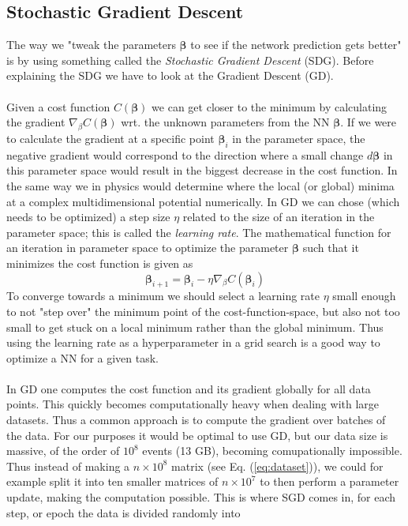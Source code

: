 \documentclass[14pt, a4paper]{book}
\begin{document}
\subsection{Stochastic Gradient Descent}\label{sec:SGD}
The way we "tweak the parameters $\bm \beta $ to see if the network prediction gets better" is by using something called the \textit{Stochastic Gradient Descent} (SDG). Before explaining the SDG we have to look at the Gradient Descent (GD). \\
\\Given a cost function $C(\bm{\beta})$ we can get closer to the minimum by calculating the gradient $\nabla_{\beta}C(\bm{\beta})$ wrt. the unknown parameters from the NN $\bm\beta$. If we were to calculate the gradient at a specific 
point $\bm{\beta}_i$ in the parameter space, the negative gradient would correspond to the direction where a small change $d\bm\beta$ in this parameter space would result in the biggest decrease in the cost function. 
In the same way we in physics would determine where the local (or global) minima at a complex multidimensional potential numerically. In GD we can chose (which needs to be optimized) a step size $\eta$ related to the size of an iteration in the parameter space; 
this is called the \textit{learning rate}. The mathematical function for an iteration in parameter space to optimize the parameter $\bm{\beta}$ such that it minimizes the cost function is given as
\begin{equation}\label{eq:GD}
    \bm{\beta}_{i+1}=\bm{\beta}_{i} -\eta\nabla_{\beta}C(\bm{\beta}_i)
\end{equation}
To converge towards a minimum we should select a learning rate $\eta$ small enough to not "step over" the minimum point of the cost-function-space, but also not too small to get stuck on a local minimum rather than the global minimum. 
Thus using the learning rate as a hyperparameter in a grid search is a good way to optimize a NN for a given task.\\
\\In GD one computes the cost function and its gradient globally for all data points. This quickly becomes computationally heavy when dealing with large datasets. Thus a common approach is to compute the gradient over batches of the data. 
For our purposes it would be optimal to use GD, but our data size is massive, of the order of $10^{8}$ events (13 GB), becoming comupationally impossible. Thus instead of making a $n\times10^8$ matrix (see Eq. (\ref{eq:dataset})), 
we could for example split it into ten smaller matrices of $n\times10^7$ to then perform a parameter update, making the computation possible. This is where SGD comes in, for each step, or epoch the data is divided randomly into 
\end{document}
